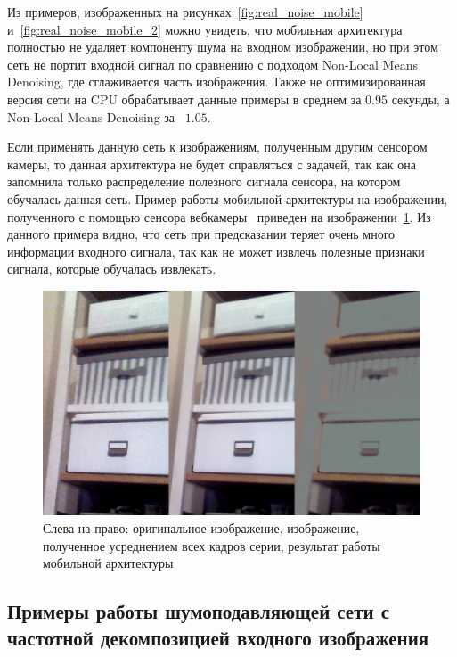 \documentclass[14pt]{mmcs_article}
\begin{document}
Из примеров, изображенных на рисунках~\ref{fig:real_noise_mobile} и~\ref{fig:real_noise_mobile_2} можно увидеть, что мобильная архитектура полностью не удаляет компоненту шума на входном изображении, но при этом сеть не портит входной сигнал по сравнению с подходом Non-Local Means Denoising, где сглаживается часть изображения. Также не оптимизированная версия сети на CPU обрабатывает данные примеры в среднем за $0.95$ секунды, а Non-Local Means Denoising за  $1.05$.

Если применять данную сеть к изображениям, полученным другим сенсором камеры, то данная архитектура не будет справляться с задачей, так как она запомнила только распределение полезного сигнала сенсора, на котором обучалась данная сеть. Пример работы мобильной архитектуры на изображении, полученного с помощью сенсора вебкамеры~\autocite{WebCam} приведен на изображении~\ref{fig:real_noise_webacam_mobile}. Из данного примера видно, что сеть при предсказании теряет очень много информации входного сигнала, так как не может извлечь полезные признаки сигнала, которые обучалась извлекать.

\begin{figure}[H]
	\centering
	\includegraphics[width=\textwidth]{img/real_noise_webacam_mobile}
	\caption{Слева на право: оригинальное изображение, изображение, полученное усреднением всех кадров серии, результат работы мобильной архитектуры}
	\label{fig:real_noise_webacam_mobile}
\end{figure}



\subsection{Примеры работы шумоподавляющей сети с частотной декомпозицией входного изображения}
\label{sec:advanced_net_test}
\end{document}
